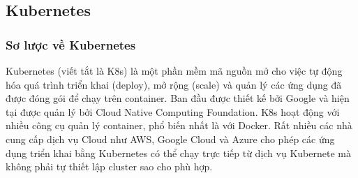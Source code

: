 \subsection{Kubernetes}
\subsubsection{Sơ lược về Kubernetes}
Kubernetes (viết tắt là K8s) là một phần mềm mã nguồn mở cho việc
tự động hóa quá trình triển khai (deploy), mở rộng (scale) và
quản lý các ứng dụng đã được đóng gói để chạy trên container.
Ban đầu được thiết kế bởi Google và hiện tại được quản lý bởi
Cloud Native Computing Foundation. K8s hoạt động với nhiều công cụ
quản lý container, phổ biến nhất là với Docker. Rất nhiều các
nhà cung cấp dịch vụ Cloud như AWS, Google Cloud và Azure cho phép
các ứng dụng triển khai bằng Kubernetes có thể chạy trực tiếp
từ dịch vụ Kubernete mà không phải tự thiết
lập cluster sao cho phù hợp. 


